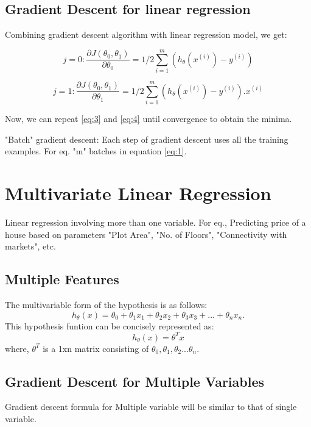   \subsection{Gradient Descent for linear regression}
    Combining gradient descent algorithm with linear regression model, we get:

    \begin{equation} \label {eq:3}
      j = 0 : \frac{\partial {J(\theta_0, \theta_1)}}{\partial \theta_0} = 1/2 \sum_{i=1}^{m} (h_\theta(x^{(i)})-y^{(i)}) 
    \end{equation}

    \begin{equation} \label {eq:4}
      j = 1 : \frac{\partial {J(\theta_0, \theta_1)}}{\partial \theta_1} = 1/2 \sum_{i=1}^{m} (h_\theta(x^{(i)})-y^{(i)}).x^{(i)}
    \end{equation}

    Now, we can repeat \ref{eq:3} and \ref{eq:4} until convergence to obtain the minima.

    "Batch" gradient descent: Each step of gradient descent uses all the training examples.
    For eq. "m" batches in equation \ref{eq:1}.

\section{Multivariate Linear Regression}
  Linear regression involving more than one variable. For eq., Predicting price of a house based on parameters "Plot Area", "No. of Floors", "Connectivity with markets", etc.

  \subsection{Multiple Features}
    The multivariable form of the hypothesis is as follows:
    \begin{equation} \label {eq:5}
      h_\theta(x) = \theta_0 + \theta_1x_1 + \theta_2x_2 + \theta_ 3x_3 + ... + \theta_{n}x_n.  
    \end{equation}
    This hypothesis funtion can be concisely represented as:
    \begin{equation}
      h_\theta(x) = \theta^{T}x
    \end{equation}
    where, $ \theta^T $ is a 1xn matrix consisting of $ \theta_0, \theta_1, \theta_2 ... \theta_n $.


  \subsection{Gradient Descent for Multiple Variables}
    Gradient descent formula for Multiple variable will be similar to that of single variable.

